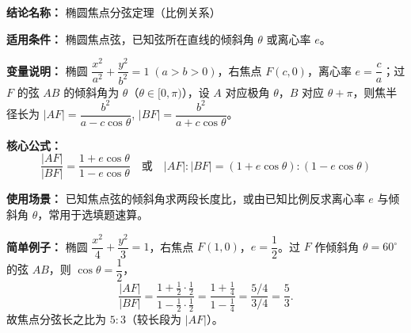 \textbf{结论名称：} 椭圆焦点分弦定理（比例关系）

\textbf{适用条件：} 椭圆焦点弦，已知弦所在直线的倾斜角 $\theta$ 或离心率 $e$。

\textbf{变量说明：} 椭圆 $\dfrac{x^2}{a^2}+\dfrac{y^2}{b^2}=1\;(a>b>0)$，右焦点 $F(c,0)$，离心率 $e=\dfrac{c}{a}$；过 $F$ 的弦 $AB$ 的倾斜角为 $\theta$（$\theta\in[0,\pi)$），设 $A$ 对应极角 $\theta$，$B$ 对应 $\theta+\pi$，则焦半径长为 $|AF|=\dfrac{b^2}{a-c\cos\theta}$, $|BF|=\dfrac{b^2}{a+c\cos\theta}$。

\textbf{核心公式：}
\[
\boxed{\frac{|AF|}{|BF|}=\frac{1+e\cos\theta}{1-e\cos\theta}
\quad\text{或}\quad |AF|:|BF|=(1+e\cos\theta):(1-e\cos\theta)}
\]

\textbf{使用场景：} 已知焦点弦的倾斜角求两段长度比，或由已知比例反求离心率 $e$ 与倾斜角 $\theta$，常用于选填题速算。

\textbf{简单例子：} 椭圆 $\dfrac{x^2}{4}+\dfrac{y^2}{3}=1$，右焦点 $F(1,0)$，$e=\dfrac12$。过 $F$ 作倾斜角 $\theta=60^\circ$ 的弦 $AB$，则 $\cos\theta=\dfrac12$，
\[
\frac{|AF|}{|BF|}=\frac{1+\frac12\cdot\frac12}{1-\frac12\cdot\frac12}
=\frac{1+\frac14}{1-\frac14}=\frac{5/4}{3/4}=\frac53.
\]
故焦点分弦长之比为 $5:3$（较长段为 $|AF|$）。